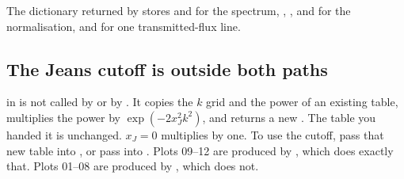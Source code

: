 \documentclass[11pt]{article}
\begin{document}
The dictionary returned by  stores  and  for the spectrum, , , and  for the normalisation, and  for one transmitted-flux line.

\subsection{The Jeans cutoff is outside both paths}

 in  is not called by  or by . It copies the \(k\) grid and the power of an existing table, multiplies the power by \(\exp(-2 x_J^2 k^2)\), and returns a new . The table you handed it is unchanged. \(x_J=0\) multiplies by one. To use the cutoff, pass that new table into , or pass  into . Plots 09--12 are produced by , which does exactly that. Plots 01--08 are produced by , which does not.



\end{document}
